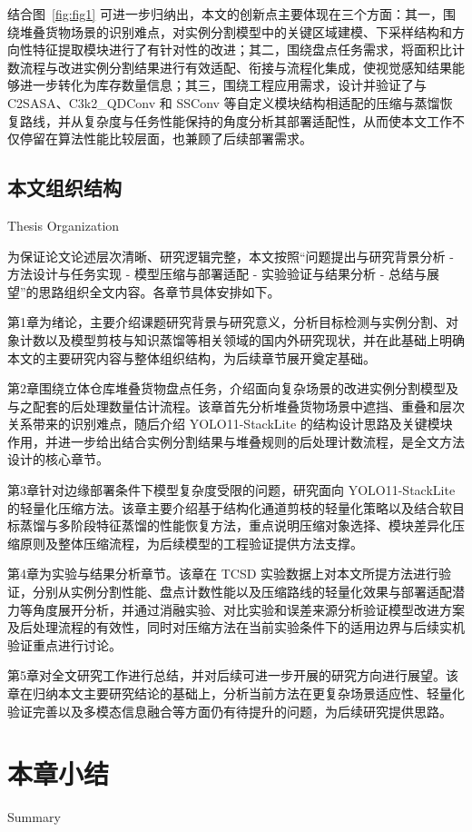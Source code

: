 结合图~\ref{fig:fig1} 可进一步归纳出，本文的创新点主要体现在三个方面：其一，围绕堆叠货物场景的识别难点，对实例分割模型中的关键区域建模、下采样结构和方向性特征提取模块进行了有针对性的改进；其二，围绕盘点任务需求，将面积比计数流程与改进实例分割结果进行有效适配、衔接与流程化集成，使视觉感知结果能够进一步转化为库存数量信息；其三，围绕工程应用需求，设计并验证了与 C2SASA、C3k2\_QDConv 和 SSConv 等自定义模块结构相适配的压缩与蒸馏恢复路线，并从复杂度与任务性能保持的角度分析其部署适配性，从而使本文工作不仅停留在算法性能比较层面，也兼顾了后续部署需求。

\subsection{本文组织结构}{Thesis Organization}

为保证论文论述层次清晰、研究逻辑完整，本文按照“问题提出与研究背景分析 - 方法设计与任务实现 - 模型压缩与部署适配 - 实验验证与结果分析 - 总结与展望”的思路组织全文内容。各章节具体安排如下。

第1章为绪论，主要介绍课题研究背景与研究意义，分析目标检测与实例分割、对象计数以及模型剪枝与知识蒸馏等相关领域的国内外研究现状，并在此基础上明确本文的主要研究内容与整体组织结构，为后续章节展开奠定基础。

第2章围绕立体仓库堆叠货物盘点任务，介绍面向复杂场景的改进实例分割模型及与之配套的后处理数量估计流程。该章首先分析堆叠货物场景中遮挡、重叠和层次关系带来的识别难点，随后介绍 YOLO11-StackLite 的结构设计思路及关键模块作用，并进一步给出结合实例分割结果与堆叠规则的后处理计数流程，是全文方法设计的核心章节。

第3章针对边缘部署条件下模型复杂度受限的问题，研究面向 YOLO11-StackLite 的轻量化压缩方法。该章主要介绍基于结构化通道剪枝的轻量化策略以及结合软目标蒸馏与多阶段特征蒸馏的性能恢复方法，重点说明压缩对象选择、模块差异化压缩原则及整体压缩流程，为后续模型的工程验证提供方法支撑。

第4章为实验与结果分析章节。该章在 TCSD 实验数据上对本文所提方法进行验证，分别从实例分割性能、盘点计数性能以及压缩路线的轻量化效果与部署适配潜力等角度展开分析，并通过消融实验、对比实验和误差来源分析验证模型改进方案及后处理流程的有效性，同时对压缩方法在当前实验条件下的适用边界与后续实机验证重点进行讨论。

第5章对全文研究工作进行总结，并对后续可进一步开展的研究方向进行展望。该章在归纳本文主要研究结论的基础上，分析当前方法在更复杂场景适应性、轻量化验证完善以及多模态信息融合等方面仍有待提升的问题，为后续研究提供思路。

\section{本章小结}{Summary}

